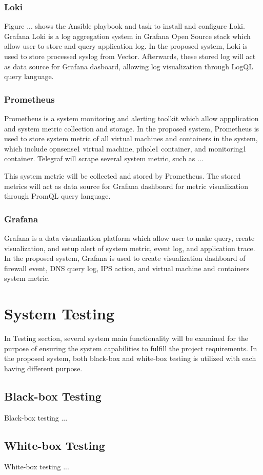 \documentclass[../index.tex]{subfiles}
\begin{document}
\subsubsection{Loki}

Figure ... shows the Ansible playbook and task to install and configure Loki. Grafana Loki is a log
aggregation system in Grafana Open Source stack which allow user to store and query application log.
In the proposed system, Loki is used to store processed syslog from Vector. Afterwards, these stored
log will act as data source for Grafana dasboard, allowing log visualization through LogQL query
language.

\subsubsection{Prometheus}

Prometheus is a system monitoring and alerting toolkit which allow appplication and system metric
collection and storage. In the proposed system, Prometheus is used to store system metric of all
virtual machines and containers in the system, which include opnsense1 virtual machine, pihole1
container, and monitoring1 container. Telegraf will scrape several system metric, such as ...

This system metric  will be collected and stored by Prometheus. The stored metrics will act as data
source for Grafana dashboard for metric visualization through PromQL query language.

\subsubsection{Grafana}

Grafana is a data visualization platform which allow user to make query, create visualization, and
setup alert of system metric, event log, and application trace. In the proposed system, Grafana is
used to create visualization dashboard of firewall event, DNS query log, IPS action, and virtual
machine and containers system metric.

\section{System Testing}

In Testing section, several system main functionality will be examined for the purpose of ensuring
the system capabilities to fulfill the project requirements. In the proposed system, both black-box
and white-box testing is utilized with each having different purpose.

\subsection{Black-box Testing}

Black-box testing ...

\subsection{White-box Testing}

White-box testing ...

\end{document}
